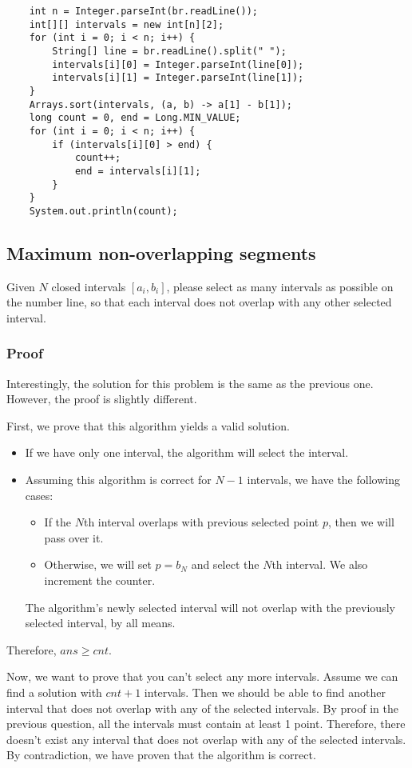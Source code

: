 \documentclass{article}
\begin{document}
\begin{verbatim}
    int n = Integer.parseInt(br.readLine());
    int[][] intervals = new int[n][2];
    for (int i = 0; i < n; i++) {
        String[] line = br.readLine().split(" ");
        intervals[i][0] = Integer.parseInt(line[0]);
        intervals[i][1] = Integer.parseInt(line[1]);
    }
    Arrays.sort(intervals, (a, b) -> a[1] - b[1]);
    long count = 0, end = Long.MIN_VALUE;
    for (int i = 0; i < n; i++) {
        if (intervals[i][0] > end) {
            count++;
            end = intervals[i][1];
        }
    }
    System.out.println(count);
\end{verbatim}

\subsection{Maximum non-overlapping segments}

Given $N$ closed intervals $[a_i,b_i]$, please select as many intervals as possible on the number line, so that each interval does not overlap with any other selected interval.

\subsubsection{Proof}

Interestingly, the solution for this problem is the same as the previous one. However, the proof is slightly different.

First, we prove that this algorithm yields a valid solution.

\begin{itemize}
    \item If we have only one interval, the algorithm will select the interval.
    \item Assuming this algorithm is correct for $N-1$ intervals, we have the following cases:

    \begin{itemize}
        \item If the $N$th interval overlaps with previous selected point $p$, then we will pass over it.
        \item Otherwise, we will set $p = b_N$ and select the $N$th interval. We also increment the counter.
    \end{itemize}

    The algorithm's newly selected interval will not overlap with the previously selected interval, by all means.
\end{itemize}

Therefore, $ans \ge cnt$.

Now, we want to prove that you can't select any more intervals. Assume we can find a solution with $cnt + 1$ intervals. Then we should be able to find another interval that does not overlap with any of the selected intervals. By proof in the previous question, all the intervals must contain at least 1 point. Therefore, there doesn't exist any interval that does not overlap with any of the selected intervals. By contradiction, we have proven that the algorithm is correct.
\end{document}
